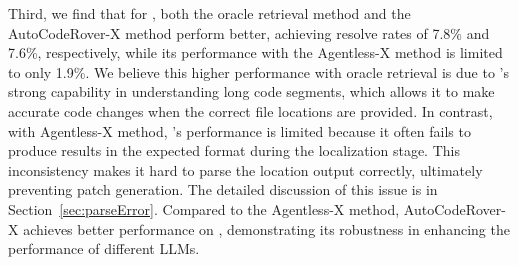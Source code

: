 
Third, we find that for \Claude, both the oracle retrieval method and the AutoCodeRover-X method perform better, achieving resolve rates of 7.8\% and 7.6\%, respectively, while its performance with the Agentless-X method is limited to only 1.9\%. 
 We believe this higher performance with oracle retrieval is due to \Claude's strong capability in understanding long code segments, which allows it to make accurate code changes when the correct file locations are provided. In contrast, with Agentless-X method, \Claude's performance is limited because it often fails to produce results in the expected format during the localization stage. This inconsistency makes it hard to parse the location output correctly, ultimately preventing patch generation. The detailed discussion of this issue is in Section~\ref{sec:parseError}. Compared to the Agentless-X method, AutoCodeRover-X achieves better performance on \Claude, demonstrating its robustness in enhancing the performance of different LLMs. 




